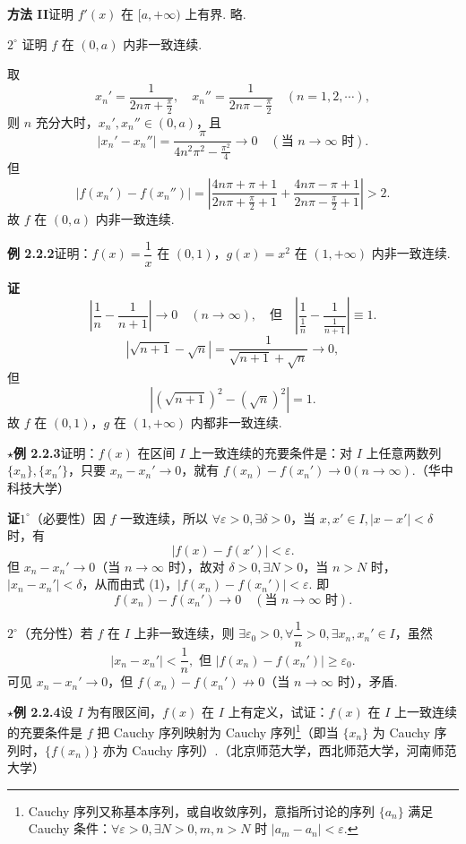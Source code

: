 \documentclass[UTF8,12pt,a4paper,fontset=fandol]{ctexart}
\begin{document}
\noindent\textbf{方法 II}\quad 证明 $f'(x)$ 在 $[a,+\infty)$ 上有界. 略.

$2^\circ$ 证明 $f$ 在 $(0,a)$ 内非一致连续.

取
\[
  x_n'=\frac1{2n\pi+\frac\pi2},\quad
  x_n''=\frac1{2n\pi-\frac\pi2}\quad(n=1,2,\cdots),
\]
则 $n$ 充分大时，$x_n',x_n''\in(0,a)$，且
\[
  |x_n'-x_n''|=\frac{\pi}{4n^2\pi^2-\frac{\pi^2}{4}}\to0\quad(\text{当 }n\to\infty\text{ 时}).
\]
但
\[
  |f(x_n')-f(x_n'')|
  =\left|\frac{4n\pi+\pi+1}{2n\pi+\frac\pi2+1}
  +\frac{4n\pi-\pi+1}{2n\pi-\frac\pi2+1}\right|>2.
\]
故 $f$ 在 $(0,a)$ 内非一致连续.

\noindent\textbf{例 2.2.2}\quad 证明：$f(x)=\dfrac1x$ 在 $(0,1)$，$g(x)=x^2$ 在 $(1,+\infty)$ 内非一致连续.

\noindent\textbf{证}\quad
\[
  \left|\frac1n-\frac1{n+1}\right|\to0\quad(n\to\infty),
  \quad\text{但}\quad
  \left|\frac1{\frac1n}-\frac1{\frac1{n+1}}\right|\equiv1.
\]
\[
  |\sqrt{n+1}-\sqrt n|=\frac1{\sqrt{n+1}+\sqrt n}\to0,
\]
但
\[
  \left|(\sqrt{n+1})^2-(\sqrt n)^2\right|=1.
\]
故 $f$ 在 $(0,1)$，$g$ 在 $(1,+\infty)$ 内都非一致连续.

\noindent\textbf{$\star$例 2.2.3}\quad 证明：$f(x)$ 在区间 $I$ 上一致连续的充要条件是：对 $I$ 上任意两数列 $\{x_n\},\{x_n'\}$，只要 $x_n-x_n'\to0$，就有 $f(x_n)-f(x_n')\to0(n\to\infty)$.（华中科技大学）

\noindent\textbf{证}\quad $1^\circ$（必要性）因 $f$ 一致连续，所以 $\forall\varepsilon>0,\exists\delta>0$，当 $x,x'\in I,|x-x'|<\delta$ 时，有
\[
  |f(x)-f(x')|<\varepsilon. \tag{1}
\]
但 $x_n-x_n'\to0$（当 $n\to\infty$ 时），故对 $\delta>0,\exists N>0$，当 $n>N$ 时，$|x_n-x_n'|<\delta$，从而由式 (1)，$|f(x_n)-f(x_n')|<\varepsilon$. 即
\[
  f(x_n)-f(x_n')\to0\quad(\text{当 }n\to\infty\text{ 时}).
\]

$2^\circ$（充分性）若 $f$ 在 $I$ 上非一致连续，则 $\exists\varepsilon_0>0,\forall\dfrac1n>0,\exists x_n,x_n'\in I$，虽然
\[
  |x_n-x_n'|<\frac1n,\text{ 但 } |f(x_n)-f(x_n')|\ge\varepsilon_0.
\]
可见 $x_n-x_n'\to0$，但 $f(x_n)-f(x_n')\not\to0$（当 $n\to\infty$ 时），矛盾.

\noindent\textbf{$\star$例 2.2.4}\quad 设 $I$ 为有限区间，$f(x)$ 在 $I$ 上有定义，试证：$f(x)$ 在 $I$ 上一致连续的充要条件是 $f$ 把 Cauchy 序列映射为 Cauchy 序列\footnote{Cauchy 序列又称基本序列，或自收敛序列，意指所讨论的序列 $\{a_n\}$ 满足 Cauchy 条件：$\forall\varepsilon>0,\exists N>0,m,n>N$ 时 $|a_m-a_n|<\varepsilon$.}（即当 $\{x_n\}$ 为 Cauchy 序列时，$\{f(x_n)\}$ 亦为 Cauchy 序列）.（北京师范大学，西北师范大学，河南师范大学）
\end{document}
